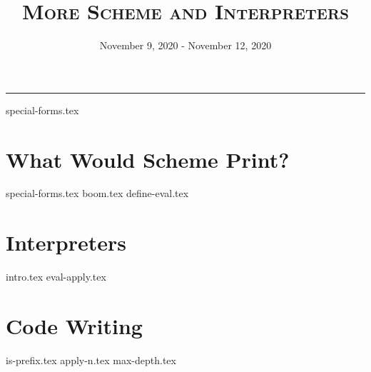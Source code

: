 \documentclass{exam}
\title{\textsc{More Scheme and Interpreters}}
\date{November 9, 2020 - November 12, 2020}
\begin{document}
\maketitle
\rule{\textwidth}{0.15em}
\fontsize{12}{15}\selectfont

{special-forms.tex}
\section{What Would Scheme Print?}
\begin{questions}
{special-forms.tex}
{boom.tex}
{define-eval.tex}
\end{questions}

\section{Interpreters}
\begin{questions}
{intro.tex}
{eval-apply.tex}
\end{questions}

\section{Code Writing}
\begin{questions}
{is-prefix.tex}
{apply-n.tex}
{max-depth.tex}
\end{questions}
\end{document}
